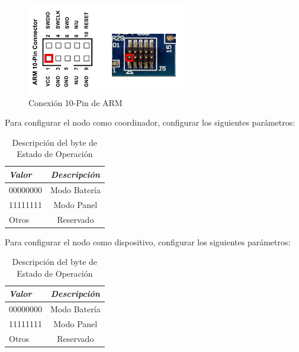 \begin{figure}[h!]
	\centering
    \includegraphics[width=.5\textwidth]{./Figures/pin.png}
    	\caption{Conexión 10-Pin de ARM}
	\label{fig:10pin}
\end{figure}

Para configurar el nodo como coordinador, configurar los siguientes parámetros:
\begin{table}[ht]
	\centering
	\caption{Descripción del byte de Estado de Operación}
	\begin{tabular}{@{} l *1c @{}}    \toprule
		\emph{\textbf{Valor}} & \emph{\textbf{Descripción}}\\
		\midrule
		00000000 &  Modo Batería\\
		11111111 &  Modo Panel\\
		Otros & Reservado\\
		\bottomrule
		\hline
	\end{tabular}
	\label{tab:edoope}
\end{table}

Para configurar el nodo como dispositivo, configurar los siguientes parámetros:
\begin{table}[ht]
	\centering
	\caption{Descripción del byte de Estado de Operación}
	\begin{tabular}{@{} l *1c @{}}    \toprule
		\emph{\textbf{Valor}} & \emph{\textbf{Descripción}}\\
		\midrule
		00000000 &  Modo Batería\\
		11111111 &  Modo Panel\\
		Otros & Reservado\\
		\bottomrule
		\hline
	\end{tabular}
	\label{tab:edoope}
\end{table}




